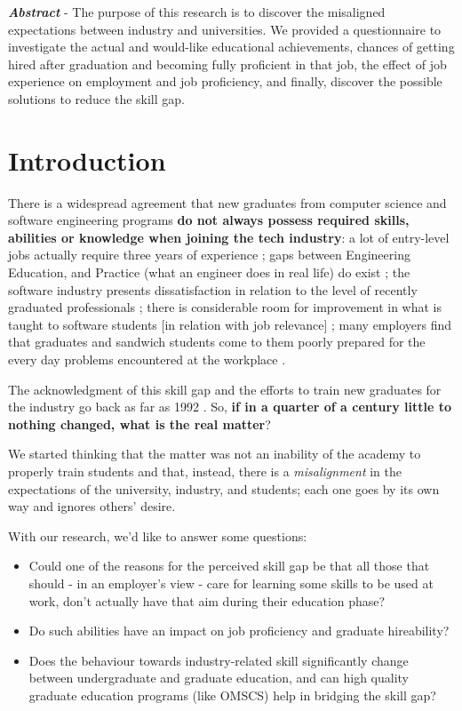 \documentclass{sigchi}
\begin{document}
\textbf{\textit{Abstract}} - The purpose of this research is to discover the misaligned expectations between industry and universities. We provided a questionnaire to investigate the actual and would-like educational achievements, chances of getting hired after graduation and becoming fully proficient in that job, the effect of job experience on employment and job proficiency, and finally, discover the possible solutions to reduce the skill gap.
  
\section{Introduction}
There is a widespread agreement that new graduates from computer science and software engineering programs \textbf{do not always possess required skills, abilities or knowledge when joining the tech industry}: a lot of entry-level jobs actually require three years of experience \cite{Chakrabarti2018}; gaps between Engineering Education, and Practice (what an engineer does in real life) do exist \cite{Sivanesan2017}; the software industry presents dissatisfaction in relation to the level of recently graduated professionals \cite{Portela2017}; there is considerable room for improvement in what is taught to software students [in relation with job relevance] \cite{Lethbridgea}; many employers find that graduates and sandwich students come to them poorly prepared for the every day problems encountered at the workplace \cite{Dawson2000}.

The acknowledgment of this skill gap and the efforts to train new graduates for the industry go back as far as 1992 \cite{Dawson1992}. So, \textbf{if in a quarter of a century little to nothing changed, what is the real matter}?

We started thinking that the matter was not an inability of the academy to properly train students and that, instead, there is a \textit{misalignment} in the expectations of the university, industry, and students; each one goes by its own way and ignores others' desire.

With our research, we'd like to answer some	questions:
\begin{itemize}
\item Could one of the reasons for the perceived skill gap be that all those that should - in an employer's view - care for learning some skills to be used at work, don't actually have that aim during their education phase? 
\item Do such abilities have an impact on job proficiency and graduate hireability?
\item Does the behaviour towards industry-related skill significantly change between undergraduate and graduate education, and can high quality graduate education programs (like OMSCS) help in bridging the skill gap?
\end{itemize}
\end{document}
